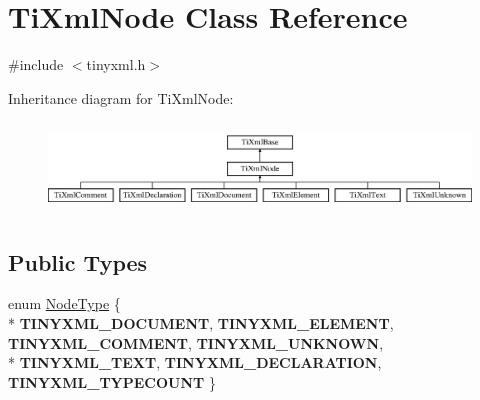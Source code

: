 \hypertarget{class_ti_xml_node}{\section{Ti\-Xml\-Node Class Reference}
\label{class_ti_xml_node}
}


{\ttfamily \#include $<$tinyxml.\-h$>$}

Inheritance diagram for Ti\-Xml\-Node\-:\begin{figure}[H]
\begin{center}
\leavevmode
\includegraphics[height=2.413793cm]{class_ti_xml_node}
\end{center}
\end{figure}
\subsection*{Public Types}
\begin{DoxyCompactItemize}
\item 
enum \hyperlink{class_ti_xml_node_a836eded4920ab9e9ef28496f48cd95a2}{Node\-Type} \{ \\*
{\bfseries T\-I\-N\-Y\-X\-M\-L\-\_\-\-D\-O\-C\-U\-M\-E\-N\-T}, 
{\bfseries T\-I\-N\-Y\-X\-M\-L\-\_\-\-E\-L\-E\-M\-E\-N\-T}, 
{\bfseries T\-I\-N\-Y\-X\-M\-L\-\_\-\-C\-O\-M\-M\-E\-N\-T}, 
{\bfseries T\-I\-N\-Y\-X\-M\-L\-\_\-\-U\-N\-K\-N\-O\-W\-N}, 
\\*
{\bfseries T\-I\-N\-Y\-X\-M\-L\-\_\-\-T\-E\-X\-T}, 
{\bfseries T\-I\-N\-Y\-X\-M\-L\-\_\-\-D\-E\-C\-L\-A\-R\-A\-T\-I\-O\-N}, 
{\bfseries T\-I\-N\-Y\-X\-M\-L\-\_\-\-T\-Y\-P\-E\-C\-O\-U\-N\-T}
 \}
\end{DoxyCompactItemize}
